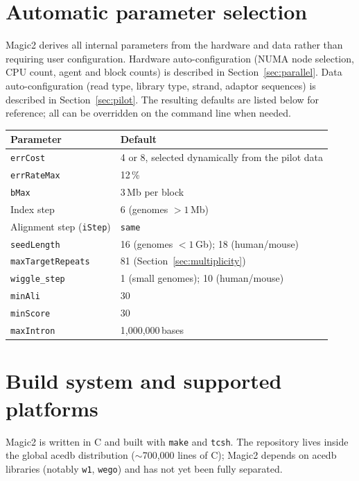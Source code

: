 \documentclass[11pt]{article}
\begin{document}
\section{Automatic parameter selection}
\label{sec:autoconfig}

Magic2 derives all internal parameters from the hardware and data
rather than requiring user configuration.
Hardware auto-configuration (NUMA node selection, CPU count, agent
and block counts) is described in Section~\ref{sec:parallel}.
Data auto-configuration (read type, library type, strand, adaptor
sequences) is described in Section~\ref{sec:pilot}.
The resulting defaults are listed below for reference; all can be
overridden on the command line when needed.

\begin{center}
\begin{tabular}{ll}
\toprule
Parameter & Default \\
\midrule
\texttt{errCost}         & 4 or 8, selected dynamically from the pilot data \\
\texttt{errRateMax}      & 12\,\% \\
\texttt{bMax}            & 3\,Mb per block \\
Index step               & 6 (genomes $>1$\,Mb) \\
Alignment step (\texttt{iStep}) & \texttt{same} \\
\texttt{seedLength}      & 16 (genomes $<1$\,Gb); 18 (human/mouse) \\
\texttt{maxTargetRepeats}& 81 (Section~\ref{sec:multiplicity}) \\
\texttt{wiggle\_step}    & 1 (small genomes); 10 (human/mouse) \\
\texttt{minAli}          & 30 \\
\texttt{minScore}        & 30 \\
\texttt{maxIntron}       & 1{,}000{,}000\,bases \\
\bottomrule
\end{tabular}
\end{center}

\section{Build system and supported platforms}
\label{sec:build}

Magic2 is written in C and built with \texttt{make} and \texttt{tcsh}.
The repository lives inside the global acedb distribution
($\sim$700{,}000 lines of C); Magic2 depends on acedb libraries
(notably \texttt{w1}, \texttt{wego}) and has not yet been fully
separated.
\end{document}

